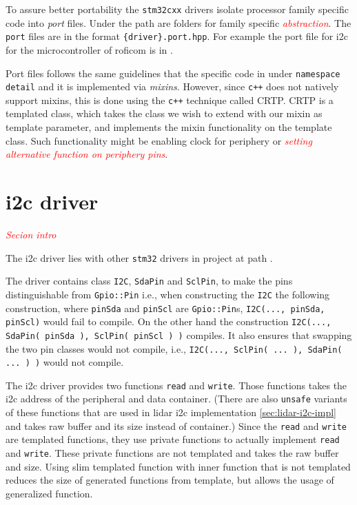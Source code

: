\documentclass[
  digital,     %
  oneside,     %
  nosansbold,  %
  nocolorbold, %
  lof,         %
  lot,         %
]{fithesis4}
\newcommand{\TODO}[1]{\textcolor{red}{\textit{#1}}}
\begin{document}
{{{To assure better portability the \verb|stm32cxx| drivers isolate processor family specific code into \emph{port} files. Under the path  are folders for family specific \TODO{abstraction}. The \verb|port| files are in the format \verb|{driver}.port.hpp|. For example the port file for \acrshort{i2c} for the microcontroller of \acrshort{roficom} is in .

Port files follows the same guidelines that the specific code in under \lstinline|namespace detail| and it is implemented via \emph{mixins}. However, since \verb|c++| does not natively support mixins, this is done using the \verb|c++| technique called CRTP. CRTP is a templated class, which takes the class we wish to extend with our mixin as template parameter, and implements the mixin functionality on the template class. Such functionality might be enabling clock for periphery or \TODO{setting alternative function on periphery pins}.

\section[ I2C driver ]{ \acrshort{i2c} driver }
\TODO{Secion intro}

The \acrshort{i2c} driver lies with other \verb|stm32| drivers in project at path .

The driver contains class \lstinline|I2C|, \lstinline|SdaPin| and \lstinline|SclPin|, to make the pins distinguishable from \lstinline|Gpio::Pin| i.e., when constructing the \lstinline|I2C| the following construction, where \lstinline|pinSda| and \lstinline|pinScl| are \lstinline|Gpio::Pin|s, \lstinline|I2C(..., pinSda, pinScl)| would fail to compile. On the other hand the construction \lstinline|I2C(..., SdaPin( pinSda ), SclPin( pinScl ) )| compiles. It also ensures that swapping the two pin classes would not compile, i.e., \lstinline|I2C(..., SclPin( ... ), SdaPin( ... ) )| would not compile.

The \acrshort{i2c} driver provides two functions \lstinline|read| and \lstinline|write|. Those functions takes the \acrshort{i2c} address of the peripheral and data container. (There are also \lstinline|unsafe| variants of these functions that are used in \acrshort{lidar} \acrshort{i2c} implementation \ref{sec:lidar-i2c-impl} and takes raw buffer and its size instead of container.) Since the \lstinline|read| and \lstinline|write| are templated functions, they use private functions to actually implement \lstinline|read| and \lstinline|write|. These private functions are not templated and takes the raw buffer and size. Using slim templated function with inner function that is not templated reduces the size of generated functions from template, but allows the usage of generalized function.

}}}
\end{document}
